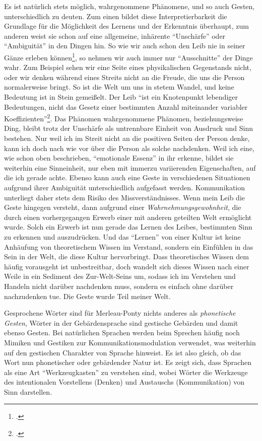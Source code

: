 \documentclass[a4paper, 12pt]{article}
\begin{document}
\begin{onehalfspace}
Es ist natürlich stets möglich, wahrgenommene Phänomene, und so auch Gesten, unterschiedlich zu deuten. Zum einen bildet diese Interpretierbarkeit die Grundlage für die Möglichkeit des Lernens und der Erkenntnis überhaupt, zum anderen weist sie schon auf eine allgemeine, inhärente "`Unschärfe"' oder "`Ambiguität"' in den Dingen hin. So wie wir auch schon den Leib nie in seiner Gänze erleben können\footnote{\Cite[Siehe][S. ???]{merleau1966phanomenologie}.}, so nehmen wir auch immer nur "`Ausschnitte"' der Dinge wahr. Zum Beispiel sehen wir eine Seite eines physikalischen Gegenstands nicht, oder wir denken während eines Streits nicht an die Freude, die uns die Person normalerweise bringt. So ist die Welt um uns in stetem Wandel, und keine Bedeutung ist in Stein gemeißelt. Der Leib "`ist ein Knotenpunkt lebendiger Bedeutungen, nicht das Gesetz einer bestimmten Anzahl miteinander variabler Koeffizienten"'\footnote{\Cite[Siehe][S. 182]{merleau1966phanomenologie}.}. Das Phänomen wahrgenommene Phänomen, beziehungsweise Ding, bleibt trotz der Unschärfe als untrennbare Einheit von Ausdruck und Sinn bestehen. Nur weil ich im Streit nicht an die positiven Seiten der Person denke, kann ich doch nach wie vor über die Person als solche nachdenken. Weil ich eine, wie schon oben beschrieben, "`emotionale Essenz"' in ihr erkenne, bildet sie weiterhin eine Sinneinheit, nur eben mit immerzu variierenden Eigenschaften, auf die ich gerade achte. Ebenso kann auch eine Geste in verschiedenen Situationen aufgrund ihrer Ambiguität unterschiedlich aufgefasst werden. Kommunikation unterliegt daher stets dem Risiko des Missverständnisses. Wenn mein Leib die Geste hingegen versteht, dann aufgrund einer \emph{Wahrnehmungsgewohnheit}, die durch einen vorhergegangen Erwerb einer mit anderen geteilten Welt ermöglicht wurde. Solch ein Erwerb ist nun gerade das Lernen des Leibes, bestimmten Sinn zu erkennen und auszudrücken. Und das "`Lernen"' von einer Kultur ist keine Anhäufung von theoretischem Wissen im Verstand, sondern ein Einfühlen in das Sein in der Welt, die diese Kultur hervorbringt. Dass theoretisches Wissen dem häufig vorausgeht ist unbestreitbar, doch wandelt sich dieses Wissen nach einer Weile in ein Sediment des Zur-Welt-Seins um, sodass ich im Verstehen und Handeln nicht darüber nachdenken muss, sondern es einfach ohne darüber nachzudenken tue. Die Geste wurde Teil meiner Welt.

Gesprochene Wörter sind für Merleau-Ponty nichts anderes als \emph{phonetische Gesten}, Wörter in der Gebärdensprache sind gestische Gebärden und damit ebenso Gesten. Bei natürlichen Sprachen werden beim Sprechen häufig noch Mimiken und Gestiken zur Kommunikationsmodulation verwendet, was weiterhin auf den gestischen Charakter von Sprache hinweist. Es ist also gleich, ob das Wort nun  phonetischer oder gebärdender Natur ist. Es zeigt sich, dass Sprachen als eine Art "`Werkzeugkasten"' zu verstehen sind, wobei Wörter die Werkzeuge des intentionalen Vorstellens (Denken) und Austauschs (Kommunikation) von Sinn darstellen. 


\end{onehalfspace}
\end{document}
